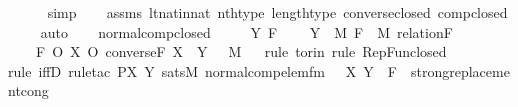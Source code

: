 \begin{isabellebody}
\ \ \ \ \isamarkupfalse%
\ simp\isanewline
\ \ \isamarkupfalse%
\ assms\ lt{\isacharunderscore}{\kern0pt}nat{\isacharunderscore}{\kern0pt}in{\isacharunderscore}{\kern0pt}nat\ nth{\isacharunderscore}{\kern0pt}type\ length{\isacharunderscore}{\kern0pt}type\ converse{\isacharunderscore}{\kern0pt}closed\ comp{\isacharunderscore}{\kern0pt}closed\isanewline
\ \ \ \isamarkupfalse%
\ auto\isanewline
\ \ \isamarkupfalse%
%
\endisatagproof
{\isafoldproof}%
%
\isadelimproof
\isanewline
%
\endisadelimproof
\isanewline
{}\isamarkupfalse%
\ normal{\isacharunderscore}{\kern0pt}comp{\isacharunderscore}{\kern0pt}closed\ {\isacharcolon}{\kern0pt}\ \isanewline
\ \ \ Y\ F\ \isanewline
\ \ \ {\isachardoublequoteopen}Y\ {\isasymin}\ M{\isachardoublequoteclose}\ {\isachardoublequoteopen}F\ {\isasymin}\ M{\isachardoublequoteclose}\ {\isachardoublequoteopen}relation{\isacharparenleft}{\kern0pt}F{\isacharparenright}{\kern0pt}{\isachardoublequoteclose}\ \isanewline
\ \ \ {\isachardoublequoteopen}{\isacharbraceleft}{\kern0pt}\ F\ O\ X\ O\ converse{\isacharparenleft}{\kern0pt}F{\isacharparenright}{\kern0pt}{\isachardot}{\kern0pt}\ X\ {\isasymin}\ Y\ {\isacharbraceright}{\kern0pt}\ {\isasymin}\ M{\isachardoublequoteclose}\isanewline
%
\isadelimproof
\isanewline
\ \ %
\endisadelimproof
%
\isatagproof
{}\isamarkupfalse%
{\isacharparenleft}{\kern0pt}rule\ to{\isacharunderscore}{\kern0pt}rin{\isacharcomma}{\kern0pt}\ rule\ RepFun{\isacharunderscore}{\kern0pt}closed{\isacharparenright}{\kern0pt}\isanewline
\ \ \ \ \isamarkupfalse%
{\isacharparenleft}{\kern0pt}rule\ iffD{}{\isacharcomma}{\kern0pt}\ rule{\isacharunderscore}{\kern0pt}tac\ P{\isacharequal}{\kern0pt}{\isachardoublequoteopen}{\isasymlambda}X\ Y{\isachardot}{\kern0pt}\ sats{\isacharparenleft}{\kern0pt}M{\isacharcomma}{\kern0pt}\ normal{\isacharunderscore}{\kern0pt}comp{\isacharunderscore}{\kern0pt}elem{\isacharunderscore}{\kern0pt}fm{\isacharparenleft}{\kern0pt}{}{\isacharcomma}{\kern0pt}\ {}{\isacharcomma}{\kern0pt}\ {}{\isacharparenright}{\kern0pt}{\isacharcomma}{\kern0pt}\ {\isacharbrackleft}{\kern0pt}X{\isacharcomma}{\kern0pt}\ Y{\isacharbrackright}{\kern0pt}\ {\isacharat}{\kern0pt}\ {\isacharbrackleft}{\kern0pt}F{\isacharbrackright}{\kern0pt}{\isacharparenright}{\kern0pt}{\isachardoublequoteclose}\ \ strong{\isacharunderscore}{\kern0pt}replacement{\isacharunderscore}{\kern0pt}cong{\isacharparenright}{\kern0pt}\isanewline

\end{isabellebody}

